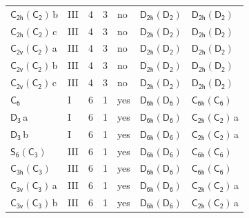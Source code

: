 \documentclass[10pt,a4paper]{article}
\numberwithin{equation}{section}
\newcommand{\grp}[1]{\mathsf{#1}}
\newcommand{\clsletter}[1]{\,{\scriptsize\color{black!55}#1}}
\begin{document}
{\begin{longtable}{@{}llrrlll@{}}
\href{C2h-C2.pdf}{$\grp{C_{2h}}(\grp{C_{2}})$}\clsletter{b} & III & 4 & 3 & no & \href{D2h-D2.pdf}{$\grp{D_{2h}}(\grp{D_{2}})$} & \href{D2h-D2.pdf}{$\grp{D_{2h}}(\grp{D_{2}})$}\\
\href{C2h-C2.pdf}{$\grp{C_{2h}}(\grp{C_{2}})$}\clsletter{c} & III & 4 & 3 & no & \href{D2h-D2.pdf}{$\grp{D_{2h}}(\grp{D_{2}})$} & \href{D2h-D2.pdf}{$\grp{D_{2h}}(\grp{D_{2}})$}\\
\href{C2v-C2.pdf}{$\grp{C_{2v}}(\grp{C_{2}})$}\clsletter{a} & III & 4 & 3 & no & \href{D2h-D2.pdf}{$\grp{D_{2h}}(\grp{D_{2}})$} & \href{D2h-D2.pdf}{$\grp{D_{2h}}(\grp{D_{2}})$}\\
\href{C2v-C2.pdf}{$\grp{C_{2v}}(\grp{C_{2}})$}\clsletter{b} & III & 4 & 3 & no & \href{D2h-D2.pdf}{$\grp{D_{2h}}(\grp{D_{2}})$} & \href{D2h-D2.pdf}{$\grp{D_{2h}}(\grp{D_{2}})$}\\
\href{C2v-C2.pdf}{$\grp{C_{2v}}(\grp{C_{2}})$}\clsletter{c} & III & 4 & 3 & no & \href{D2h-D2.pdf}{$\grp{D_{2h}}(\grp{D_{2}})$} & \href{D2h-D2.pdf}{$\grp{D_{2h}}(\grp{D_{2}})$}\\
\href{../../../rotation/data/pdf/C6.pdf}{$\grp{C_{6}}$} & I & 6 & 1 & yes & \href{D6h-D6.pdf}{$\grp{D_{6h}}(\grp{D_{6}})$} & \href{C6h-C6.pdf}{$\grp{C_{6h}}(\grp{C_{6}})$}\\
\href{../../../rotation/data/pdf/D3.pdf}{$\grp{D_{3}}$}\clsletter{a} & I & 6 & 1 & yes & \href{D6h-D6.pdf}{$\grp{D_{6h}}(\grp{D_{6}})$} & \href{C2h-C2.pdf}{$\grp{C_{2h}}(\grp{C_{2}})$}\clsletter{a}\\
\href{../../../rotation/data/pdf/D3.pdf}{$\grp{D_{3}}$}\clsletter{b} & I & 6 & 1 & yes & \href{D6h-D6.pdf}{$\grp{D_{6h}}(\grp{D_{6}})$} & \href{C2h-C2.pdf}{$\grp{C_{2h}}(\grp{C_{2}})$}\clsletter{a}\\
\href{S6-C3.pdf}{$\grp{S_{6}}(\grp{C_{3}})$} & III & 6 & 1 & yes & \href{D6h-D6.pdf}{$\grp{D_{6h}}(\grp{D_{6}})$} & \href{C6h-C6.pdf}{$\grp{C_{6h}}(\grp{C_{6}})$}\\
\href{C3h-C3.pdf}{$\grp{C_{3h}}(\grp{C_{3}})$} & III & 6 & 1 & yes & \href{D6h-D6.pdf}{$\grp{D_{6h}}(\grp{D_{6}})$} & \href{C6h-C6.pdf}{$\grp{C_{6h}}(\grp{C_{6}})$}\\
\href{C3v-C3.pdf}{$\grp{C_{3v}}(\grp{C_{3}})$}\clsletter{a} & III & 6 & 1 & yes & \href{D6h-D6.pdf}{$\grp{D_{6h}}(\grp{D_{6}})$} & \href{C2h-C2.pdf}{$\grp{C_{2h}}(\grp{C_{2}})$}\clsletter{a}\\
\href{C3v-C3.pdf}{$\grp{C_{3v}}(\grp{C_{3}})$}\clsletter{b} & III & 6 & 1 & yes & \href{D6h-D6.pdf}{$\grp{D_{6h}}(\grp{D_{6}})$} & \href{C2h-C2.pdf}{$\grp{C_{2h}}(\grp{C_{2}})$}\clsletter{a}\\

\end{longtable}}
\end{document}
